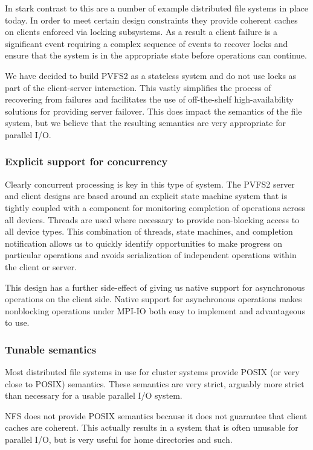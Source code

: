 In stark contrast to this are a number of example distributed file systems in
place today.  In order to meet certain design constraints they provide
coherent caches on clients enforced via locking subsystems.  As a result a
client failure is a significant event requiring a complex sequence of events
to recover locks and ensure that the system is in the appropriate state before
operations can continue.

We have decided to build PVFS2 as a stateless system and do not use locks as
part of the client-server interaction.  This vastly simplifies the process of
recovering from failures and facilitates the use of off-the-shelf
high-availability solutions for providing server failover.  This does impact
the semantics of the file system, but we believe that the resulting semantics
are very appropriate for parallel I/O.

\subsubsection{Explicit support for concurrency}

Clearly concurrent processing is key in this type of system.  The PVFS2 server
and client designs are based around an explicit state machine system that is
tightly coupled with a component for monitoring completion of operations
across all devices.  Threads are used where necessary to provide non-blocking
access to all device types.  This combination of threads, state machines, and
completion notification allows us to quickly identify opportunities to make
progress on particular operations and avoids serialization of independent
operations within the client or server.

This design has a further side-effect of giving us native support for
asynchronous operations on the client side.  Native support for asynchronous
operations makes nonblocking operations under MPI-IO both easy to implement
and advantageous to use.

\subsubsection{Tunable semantics}

Most distributed file systems in use for cluster systems provide POSIX (or
very close to POSIX) semantics.  These semantics are very strict, arguably
more strict than necessary for a usable parallel I/O system.

NFS does not provide POSIX semantics because it does not guarantee that client
caches are coherent.  This actually results in a system that is often unusable
for parallel I/O, but is very useful for home directories and such.

